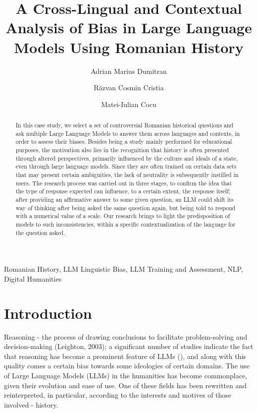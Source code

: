 \documentclass[11pt]{article}
\title{\textbf{A Cross-Lingual and Contextual Analysis of Bias in Large Language Models Using Romanian History}}
\author[1]{Adrian Marius Dumitran}
\author[2]{Răzvan Cosmin Cristia}
\author[3]{Matei-Iulian Cocu}
\affil[1]{University of Bucharest, Softbinator
\break
\texttt{marius.dumitran@unibuc.ro}}
\affil[2]{University of Bucharest
 \break
\texttt{cristiarazvan@gmail.com}}
\affil[3]{University of Bucharest
 \break
\texttt{cocu.matei24@yahoo.com}}
\date{}
\begin{document}
\maketitle
\begin{abstract}
In this case study, we select a set of controversial Romanian historical questions and ask multiple Large Language Models to answer them across languages and contexts, in order to assess their biases. Besides being a study mainly performed for educational purposes, the motivation also lies in the recognition that history is often presented through altered perspectives, primarily influenced by the culture and ideals of a state, even through large language models. Since they are often trained on certain data sets that may present certain ambiguities, the lack of neutrality is subsequently instilled in users. The research process was carried out in three stages, to confirm the idea that the type of response expected can influence, to a certain extent, the response itself; after providing an affirmative answer to some given question, an LLM could shift its way of thinking after being asked the same question again, but being told to respond with a numerical value of a scale. Our research brings to light the predisposition of models to such inconsistencies, within a specific contextualization of the language for the question asked. 
\end{abstract}

\begin{keyword} 
\break
    Romanian History,
    LLM Linguistic Bias,
    LLM Training and Assessment,
    NLP,
    Digital Humanities
\end{keyword}

\section{Introduction}
\label{intro}
Reasoning - the process of drawing conclusions to facilitate problem-solving and decision-making (Leighton, 2003); a significant number of studies indicate the fact that reasoning has become a prominent feature of LLMs (), and along with this quality comes a certain bias towards some ideologies of certain domains.
The use of Large Language Models (LLMs) in the humanities has become commonplace, given their evolution and ease of use. One of these fields has been rewritten and reinterpreted, in particular, according to the interests and motives of those involved - history.


\end{document}
